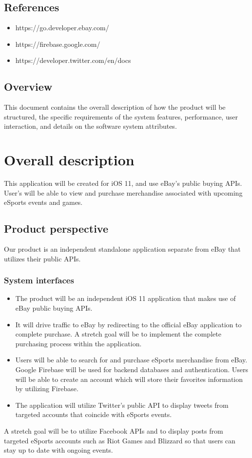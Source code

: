 \documentclass[onecolumn, draftclsnofoot,10pt, compsoc]{IEEEtran}
\begin{document}
\subsection{References}

\begin{itemize}
\item https://go.developer.ebay.com/
\item https://firebase.google.com/
\item https://developer.twitter.com/en/docs
\end{itemize}

\subsection{Overview}
This document contains the overall description of how the product will be structured, the specific requirements of the system features, performance, user interaction, and details on the software system attributes.
    
\section{Overall description}
This application will be created for iOS 11, and use eBay's public buying APIs. User's will be able to view and purchase merchandise associated with upcoming eSports events and games.

\subsection{Product perspective}
Our product is an independent standalone application separate from eBay that utilizes their public APIs.

\subsubsection{System interfaces}
\begin{itemize}
\item The product will be an independent iOS 11 application that makes use of eBay public buying APIs. 
\item It will drive traffic to eBay by redirecting to the official eBay application to complete purchase. A stretch goal will be to implement the complete purchasing process within the application.  
\item Users will be able to search for and purchase eSports merchandise from eBay. 
Google Firebase will be used for backend databases and authentication. Users will be able to create an account which will store their favorites information by utilizing Firebase. 
\item The application will utilize Twitter's public API to display tweets from targeted accounts that coincide with eSports events.
\end{itemize}
A stretch goal will be to utilize Facebook APIs and to display posts from targeted eSports accounts such as Riot Games and Blizzard so that users can stay up to date with ongoing events. 
\end{document}
